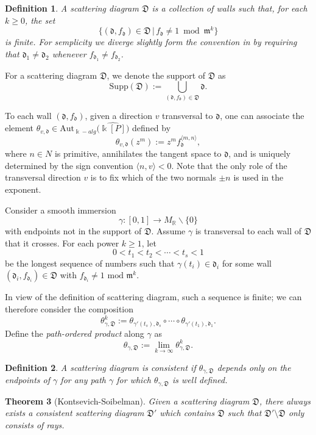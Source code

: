 \documentclass[12pt]{amsart}
\newtheorem{theorem}{Theorem}[section]
\newtheorem{defn}[theorem]{Definition}
\theoremstyle{remark}
\numberwithin{equation}{section}
\newcommand{\dd}{\mathfrak{d}}
\newcommand{\DD}{\mathfrak{D}}
\newcommand{\fom}{\mathfrak{m}}
\begin{document}
\begin{defn}
  \label{def:scattering_diagram}
  A scattering diagram $\DD$ is a collection of walls such that, for each $k \geq
  0$, the set
  \[
    \{ (\dd, f_{\dd}) \in \DD\, |\, f_{\dd} \neq 1 \bmod \fom^k \}
  \]
  is finite. For semplicity we diverge slightly form the convention in
  \cite{GHKK} by requiring that $\dd_1 \neq \dd_2$ whenever $f_{\dd_1}\neq
  f_{\dd_2}$.
\end{defn}

For a scattering diagram $\DD$, we denote the support of $\DD$ as
\[
  \text{Supp} (\DD) := \bigcup_{(\dd, f_{\dd}) \in \DD} \dd. 
\]

To each wall $(\dd, f_{\dd})$, given a direction $v$ transversal to $\dd$, one
can associate the element $\theta_{v,\dd}\in
{\mathrm{Aut}}_{\Bbbk-alg}\big(\widehat{\Bbbk[P]}\big)$ defined by
\[
  \theta_{v,\dd} (z^m) := z^m f_{\dd}^{\langle m, n \rangle }, 
\]
where $n\in N$ is primitive, annihilates the tangent space to $\dd$, and is
uniquely determined by the sign convention $ \langle n, v \rangle <0$.  Note
that the only role of the transversal direction $v$ is to fix which of the two
normals $\pm n$ is used in the exponent. 

Consider a smooth immersion
\[  
  \gamma: [0,1] \rightarrow M_{\mathbb{R}} \backslash  \{0 \}  
\]
with endpoints not in the support of $\DD$. Assume $\gamma$ is transversal to
each wall of $\DD$ that it crosses. For each power $k \geq 1$, let  
\[
  0< t_1 <  t_2 < \cdots < t_s < 1 
\]
be the longest sequence of numbers such that $\gamma(t_i)\in\dd_i$ for some wall
$(\dd_i,f_{\dd_i}) \in \DD$ with $f_{\dd_i} \neq 1 \text{ mod } \fom^k$.

In view of the definition of scattering diagram, such a sequence is finite; we
can therefore consider the composition 
\[
  \theta^k_{\gamma, \DD} :=
  \theta_{\gamma'(t_s),\dd_s} \circ \cdots \circ \theta_{\gamma'(t_1),\dd_1}.
\]
Define the \textit{path-ordered product} along $\gamma$ as
\[
  \theta_{\gamma, \DD} := \lim_{k \rightarrow \infty} \theta ^k_{\gamma, \DD}. 
\]

\begin{defn}
  A scattering diagram is \emph{consistent} if $\theta _{\gamma, \DD}$ depends
  only on the endpoints of $\gamma$ for any path $\gamma$ for which
  $\theta_{\gamma, \DD}$ is well defined.
\end{defn}

\begin{theorem}[Kontsevich-Soibelman] 
  \label{KS}
  Given a scattering diagram $\DD$, there always exists a consistent scattering
  diagram $\DD'$ which contains $\DD$ such that $\DD'\setminus\DD$ only consists
  of rays.
\end{theorem}
\end{document}
